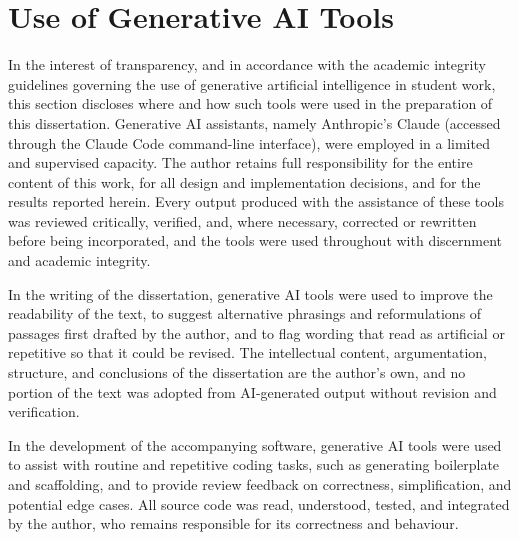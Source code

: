\section{Use of Generative AI Tools}
\label{sec:genai}

\par In the interest of transparency, and in accordance with the academic integrity guidelines governing the use of generative artificial intelligence in student work, this section discloses where and how such tools were used in the preparation of this dissertation. Generative AI assistants, namely Anthropic's Claude (accessed through the Claude Code command-line interface), were employed in a limited and supervised capacity. The author retains full responsibility for the entire content of this work, for all design and implementation decisions, and for the results reported herein. Every output produced with the assistance of these tools was reviewed critically, verified, and, where necessary, corrected or rewritten before being incorporated, and the tools were used throughout with discernment and academic integrity.

\par In the writing of the dissertation, generative AI tools were used to improve the readability of the text, to suggest alternative phrasings and reformulations of passages first drafted by the author, and to flag wording that read as artificial or repetitive so that it could be revised. The intellectual content, argumentation, structure, and conclusions of the dissertation are the author's own, and no portion of the text was adopted from AI-generated output without revision and verification.

\par In the development of the accompanying software, generative AI tools were used to assist with routine and repetitive coding tasks, such as generating boilerplate and scaffolding, and to provide review feedback on correctness, simplification, and potential edge cases. All source code was read, understood, tested, and integrated by the author, who remains responsible for its correctness and behaviour.
